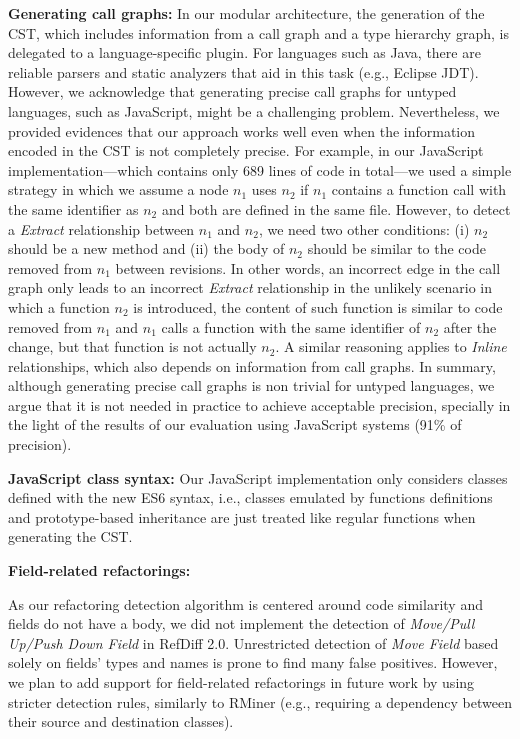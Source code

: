 \documentclass[10pt,journal,compsoc]{IEEEtran}
\begin{document}
\noindent\textbf{Generating call graphs:} In our modular architecture, the generation of the CST, which includes information from a call graph and a type hierarchy graph, is delegated to a language-specific plugin.
For languages such as Java, there are reliable parsers and static analyzers that aid in this task (e.g., Eclipse JDT).
However, we acknowledge that generating precise call graphs for untyped languages, such as JavaScript, might be a challenging problem.
Nevertheless, we provided evidences that our approach works well even when the information encoded in the CST is not completely precise.
For example, in our JavaScript implementation---which contains only 689 lines of code in total---we used a simple strategy in which we assume a node $n_1$ uses $n_2$ if $n_1$ contains a function call with the same identifier as $n_2$ and both are defined in the same file.
However, to detect a \emph{Extract} relationship between $n_1$ and $n_2$, we need two other conditions: (i) $n_2$ should be a new method and (ii) the body of $n_2$ should be similar to the code removed from $n_1$ between revisions.
In other words, an incorrect edge in the call graph only leads to an incorrect \emph{Extract} relationship in the unlikely scenario in which a function $n_2$ is introduced, the content of such function is similar to code removed from $n_1$ and $n_1$ calls a function with the same identifier of $n_2$ after the change, but that function is not actually $n_2$.
A similar reasoning applies to \emph{Inline} relationships, which also depends on information from call graphs.
In summary, although generating precise call graphs is non trivial for untyped languages, we argue that it is not needed in practice to achieve acceptable  precision, specially in the light of the results of our evaluation using JavaScript systems (91\% of precision).

\noindent\textbf{JavaScript class syntax:} Our JavaScript implementation only considers classes defined with the new ES6 syntax, i.e., classes emulated by  functions definitions and prototype-based inheritance are just treated like regular functions when generating the CST.

\noindent\textbf{Field-related refactorings:}

As our refactoring detection algorithm is centered around code similarity and fields do not have a body, we did not implement the detection of \emph{Move/Pull Up/Push Down Field} in RefDiff 2.0.
Unrestricted detection of \emph{Move Field} based solely on fields' types and names is prone to find many false positives.
However, we plan to add support for field-related refactorings in future work by using stricter detection rules, similarly to RMiner (e.g., requiring a dependency between their source and destination classes).
\end{document}
